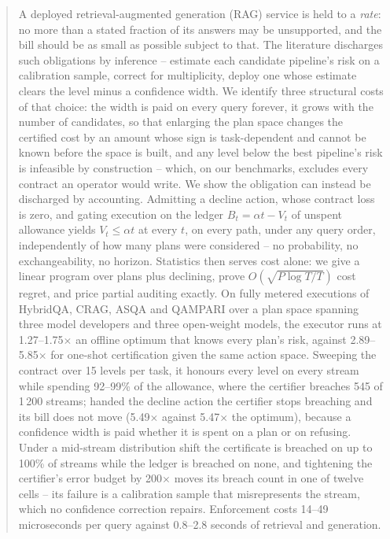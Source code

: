 \documentclass[a4paper,fleqn]{cas-dc}
\begin{document}
\begin{abstract}
A deployed retrieval-augmented generation (RAG) service is held to a
\emph{rate}: no more than a stated fraction of its answers may be
unsupported, and the bill should be as small as possible subject to
that. The literature discharges such obligations by inference --
estimate each candidate pipeline's risk on a calibration sample,
correct for multiplicity, deploy one whose estimate clears the level
minus a confidence width. We identify three structural costs of that
choice: the width is paid on every query forever, it grows with the
number of candidates, so that enlarging the plan space changes the
certified cost by an amount whose sign is task-dependent and cannot be
known before the space is built, and any level below the best
pipeline's risk is infeasible by construction -- which, on our
benchmarks, excludes every contract an operator would write. We show
the obligation can instead be discharged by accounting. Admitting a
decline action, whose contract loss is zero, and gating execution on
the ledger $B_t = \alpha t - V_t$ of unspent allowance yields
$V_t \le \alpha t$ at every $t$, on every path, under any query order,
independently of how many plans were considered -- no probability, no
exchangeability, no horizon. Statistics then serves cost alone: we give
a linear program over plans plus declining, prove
$O(\sqrt{P\log T/T})$ cost regret, and price partial auditing exactly.
On fully metered executions of HybridQA, CRAG, ASQA and QAMPARI over a
plan space spanning three model developers and three open-weight
models, the executor runs at 1.27--1.75$\times$ an offline optimum that
knows every plan's risk, against 2.89--5.85$\times$ for one-shot
certification given the same action space. Sweeping the contract over
15 levels per task, it honours every level on every stream while
spending 92--99\% of the allowance, where the certifier breaches 545 of
1\,200 streams; handed the decline action the certifier stops breaching
and its bill does not move (5.49$\times$ against 5.47$\times$ the
optimum), because a confidence width is paid whether it is spent on a
plan or on refusing. Under a mid-stream distribution shift the
certificate is breached on up to 100\% of streams while the ledger is
breached on none, and tightening the certifier's error budget by
200$\times$ moves its breach count in one of twelve cells -- its failure
is a calibration sample that misrepresents the stream, which no
confidence correction repairs. Enforcement costs 14--49 microseconds per
query against 0.8--2.8 seconds of retrieval and generation.
\end{abstract}
\end{document}
